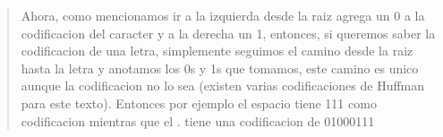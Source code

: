 \begin{quote}
    Ahora, como mencionamos ir a la izquierda desde la raiz agrega un 0 a la codificacion del caracter y a la derecha un 1, entonces, si queremos saber la codificacion de una letra, simplemente seguimos el camino desde la raiz hasta la letra y anotamos los 0s y 1s que tomamos, este camino es unico aunque la codificacion no lo sea  (existen varias codificaciones de Huffman para este texto). Entonces por ejemplo el espacio tiene 111 como codificacion mientras que el . tiene una codificacion de 01000111 \vspace{.2cm} 
\end{quote}